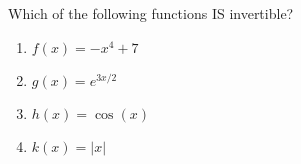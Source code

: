 \bigskip

\item Which of the following functions IS invertible?

\begin{enumerate}
\item $f(x) = -x^4 + 7$
\item $g(x) = e^{3x/2}$
\item $h(x) = \cos(x)$
\item $k(x) = |x|$
\end{enumerate}

